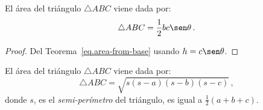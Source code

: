 \begin{theorem} El área del triángulo $\triangle ABC$ viene dada por:
\begin{align}\label{eq.area-from-sine}
\triangle ABC = \frac{1}{2}bc\sen \theta\,.
\end{align}
\end{theorem}
\begin{proof} Del Teorema~\ref{eq.area-from-base} usando
$h=c\sen \theta$.
\end{proof}



\begin{theorem}[Heron] El área del triángulo $\triangle ABC$ viene dada por:\label{thm.heron} 
\[
\triangle ABC = \sqrt{s(s-a)(s-b)(s-c)}\,,
\]
donde $s$, es el \emph{semi-perímetro} del triángulo, es igual a  $\frac{1}{2}(a+b+c)$.
\end{theorem}


